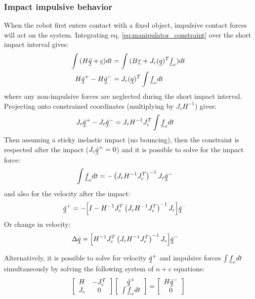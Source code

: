 \subsubsection{Impact impulsive behavior}
\label{sec:impact}
%
When the robot first enters contact with a fixed object, impulsive contact forces will act on the system. Integrating eq. \eqref{eq:manipulator_constraint} over the short impact interval gives:
%
\begin{align}
	\int{ ( H \underline{\ddot{q}} + \underline{c} ) dt } &= \int{ ( B \underline{\tau} + J_c( \underline{ q } )^T  \underline{f}_c ) dt } \\
	H \underline{\dot{q}}^+ - H \underline{\dot{q}}^- &= J_c( \underline{ q } )^T  \int{  \underline{f}_c dt }
	\label{eq:manipulator_impact}
\end{align}
%
where any non-impulsive forces are neglected during the short impact interval. Projecting onto constrained coordinates (multiplying by $J_c H^{-1}$) gives:
%
\begin{align}
	J_c \underline{\dot{q}}^+ - J_c \underline{\dot{q}}^- &= J_c H^{-1} J_c^T  \int{  \underline{f}_c dt }
	\label{eq:manipulator_impact2}
\end{align}
%
Then assuming a sticky inelastic impact (no bouncing), then the constraint is respected after the impact ($J_c \underline{\dot{q}}^+=0$) and it is possible to solve for the impact force:
%
\begin{align}
	\int{  \underline{f}_c dt } &= - \left( J_c H^{-1} J_c^T \right)^{-1}  J_c \underline{\dot{q}}^-
	\label{eq:manipulator_impact_force}
\end{align}
%
and also for the velocity after the impact:
%
\begin{align}
	\underline{\dot{q}}^+ &= - \Big[ I - H^{-1} J_c^T \left( J_c H^{-1} J_c^T \right)^{-1} J_c \Big] \underline{\dot{q}}^-
	\label{eq:manipulator_impact_velocity}
\end{align}
%
Or change in velocity:
%
\begin{align}
	\Delta \underline{\dot{q}} &=  \Big[ H^{-1} J_c^T \left( J_c H^{-1} J_c^T \right)^{-1} J_c \Big] \underline{\dot{q}}^-
	\label{eq:manipulator_impact_velocity_delta}
\end{align}
%

Alternatively, it is possible to solve for velocity $\underline{\dot{q}}^+$ and impulsive forces $\int{ \underline{f}_c dt }$ simultaneously by solving the following system of $n+c$ equations:
%
\begin{align}
	\left[ \begin{array}{c c }     H & -J_c^T  \\ J_c     & 0    \end{array} \right] \left[ \begin{array}{c} \underline{\dot{q}}^+  \\ \int{ \underline{f}_c dt }\end{array} \right] = \left[ \begin{array}{c}      H \underline{\dot{q}}^-   \\ 0  \end{array} \right]
	\label{eq:manipulator_impact_eom}
\end{align}

